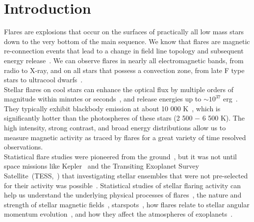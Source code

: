 \documentclass{aa}
\begin{document}
\section{Introduction}
Flares are explosions that occur on the surfaces of practically all low mass stars down to the very bottom of the main sequence. We know that flares are magnetic re-connection events that lead to a change in field line topology and subsequent energy release~\citep{priest_magnetic_2002}. We can observe flares in nearly all electromagnetic bands, from radio
to X-ray, and on all stars that possess a convection zone, from late F type stars to ultracool dwarfs~\citep{schaefer2000,benz2010,gizis2013}. 
\\
Stellar flares on cool stars can enhance the optical flux by multiple orders of magnitude within minutes or seconds~\citep{haisch1991, schmidt2019}, and release energies up to $\sim10^{37}$ erg~\citep{maehara2012, davenport_kepler_2016}. They typically exhibit blackbody emission at about 10 000 K~\citep{hawley1992, kowalski2013}, which is significantly hotter than the photospheres of these stars (2 500 $-$ 6 500 K). The high intensity, strong contrast, and broad energy distributions allow us to measure magnetic activity as traced by flares for a great variety of time resolved observations.
\\
Statistical flare studies were pioneered from the ground~\citep{lacy_uv_1976}, but it was not until space missions like Kepler~\citep{koch2010} and the Transiting Exoplanet Survey Satellite~(TESS,~\citealt{ricker2014}) that investigating stellar ensembles that were not pre-selected for their activity was possible~\citep{walkowicz2011}. Statistical studies of stellar flaring activity can help us understand the underlying physical processes of flares~\citep{benz2010}, the nature and strength of stellar magnetic fields~\citep{berger2006, odert2017}, starspots~\citep{davenport_flaresandspots_2015, howard2020}, how flares relate to stellar angular momentum evolution~\citep{mondrik2019, howard2020}, and how they affect the atmospheres of exoplanets~\citep{lecavelier_flareescape_2012, loyd_mflaresplanetsfuv_2018, tilley_repeated_flare_2019, howard2019}.%
\end{document}
